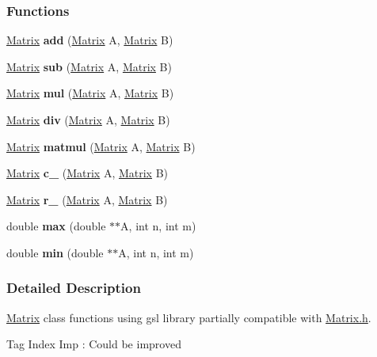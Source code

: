\subsubsection*{Functions}
\begin{DoxyCompactItemize}
\item 
\mbox{\label{Matrix__gsl_8C_a9300897ae0d96a9c6e599b5d054d467c}} 
\hyperlink{classMatrix}{Matrix} {\bfseries add} (\hyperlink{classMatrix}{Matrix} A, \hyperlink{classMatrix}{Matrix} B)
\item 
\mbox{\label{Matrix__gsl_8C_afdb38b4e9def92cb3ba67e4895fdcb22}} 
\hyperlink{classMatrix}{Matrix} {\bfseries sub} (\hyperlink{classMatrix}{Matrix} A, \hyperlink{classMatrix}{Matrix} B)
\item 
\mbox{\label{Matrix__gsl_8C_ac8e81b9762dbd22fb97ba543b9f7a3a8}} 
\hyperlink{classMatrix}{Matrix} {\bfseries mul} (\hyperlink{classMatrix}{Matrix} A, \hyperlink{classMatrix}{Matrix} B)
\item 
\mbox{\label{Matrix__gsl_8C_ad89a5d42047fb5f90e6b16ba8e3c1717}} 
\hyperlink{classMatrix}{Matrix} {\bfseries div} (\hyperlink{classMatrix}{Matrix} A, \hyperlink{classMatrix}{Matrix} B)
\item 
\mbox{\label{Matrix__gsl_8C_aae80f28cb8803956de0c56c1618a7459}} 
\hyperlink{classMatrix}{Matrix} {\bfseries matmul} (\hyperlink{classMatrix}{Matrix} A, \hyperlink{classMatrix}{Matrix} B)
\item 
\mbox{\label{Matrix__gsl_8C_a6b6043237c9821d9889356dc6ec120b7}} 
\hyperlink{classMatrix}{Matrix} {\bfseries c\+\_\+} (\hyperlink{classMatrix}{Matrix} A, \hyperlink{classMatrix}{Matrix} B)
\item 
\mbox{\label{Matrix__gsl_8C_a4cf258bad2d4532e818c44d52af46078}} 
\hyperlink{classMatrix}{Matrix} {\bfseries r\+\_\+} (\hyperlink{classMatrix}{Matrix} A, \hyperlink{classMatrix}{Matrix} B)
\item 
\mbox{\label{Matrix__gsl_8C_ad150dfc63c53d24d88b344780c1f622f}} 
double {\bfseries max} (double $\ast$$\ast$A, int n, int m)
\item 
\mbox{\label{Matrix__gsl_8C_ab9bafe12f66bfe8e15fd56efa85ae061}} 
double {\bfseries min} (double $\ast$$\ast$A, int n, int m)
\end{DoxyCompactItemize}


\subsubsection{Detailed Description}
\hyperlink{classMatrix}{Matrix} class functions using gsl library partially compatible with \hyperlink{Matrix_8h}{Matrix.\+h}. 

Tag Index Imp \+: Could be improved 